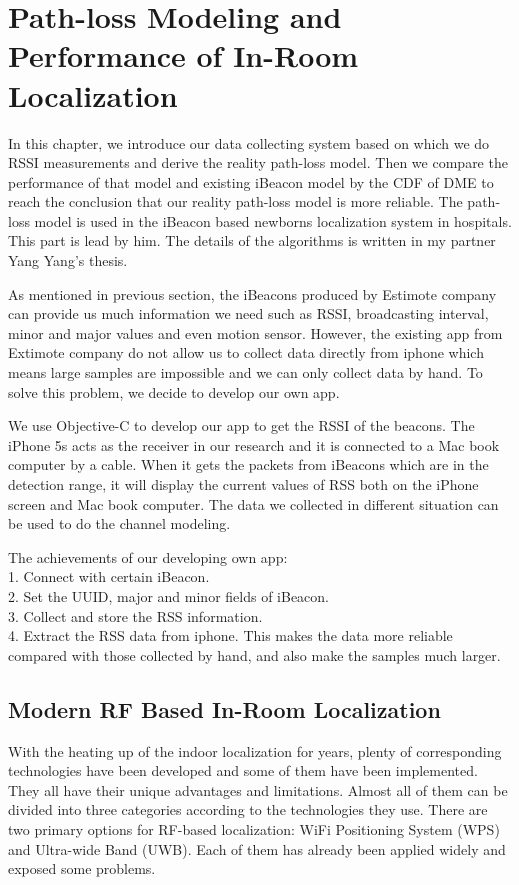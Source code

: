 \documentclass[12pt]{report}
\begin{document}
\chapter{Path-loss Modeling and Performance of In-Room Localization}
In this chapter, we introduce our data collecting system based on which we do RSSI measurements and derive the reality path-loss model. Then we compare the performance of that model and existing iBeacon model by the CDF of DME to reach the conclusion that our reality path-loss model is more reliable. The path-loss model is used in the iBeacon based newborns localization system in hospitals. This part is lead by him. The details of the algorithms is written in my partner Yang Yang's thesis.

As mentioned in previous section, the iBeacons produced by Estimote company can provide us much information we need such as RSSI, broadcasting interval, minor and major values and even motion sensor. However, the existing app from Extimote company do not allow us to collect data directly from iphone which means large samples are impossible and we can only collect data by hand. To solve this problem, we decide to develop our own app.

We use Objective-C to develop our app to get the RSSI of the beacons. The iPhone 5s acts as the receiver in our research and it is connected to a Mac book computer by a cable. When it gets the packets from iBeacons which are in the detection range, it will display the current values of RSS both on the iPhone screen and Mac book computer. The data we collected in different situation can be used to do the channel modeling. 

The achievements of our developing own app:\\
1. Connect with certain iBeacon.\\
2. Set the UUID, major and minor fields of iBeacon.\\
3. Collect and store the RSS information.\\
4. Extract the RSS data from iphone. This makes the data more reliable compared with those collected by hand, and also make the samples much larger.

\section{Modern RF Based In-Room Localization}
With the heating up of the indoor localization for years, plenty of corresponding technologies have been developed and some of them have been implemented. They all have their unique advantages and limitations. Almost all of them can be divided into three categories according to the technologies they use. There are two primary options for RF-based localization: WiFi Positioning System (WPS) and Ultra-wide Band (UWB). Each of them has already been applied widely and exposed some problems. 
\end{document}
